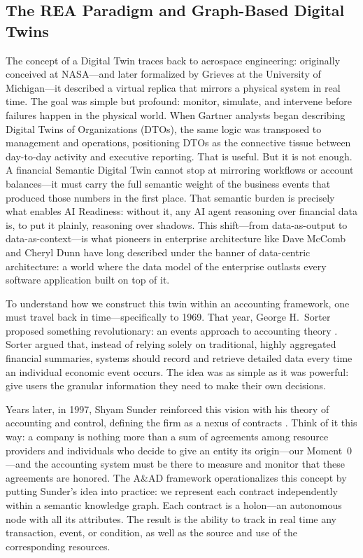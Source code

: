 \documentclass[12pt, a4paper]{article}
\begin{document}
\subsection{The REA Paradigm and Graph-Based Digital Twins}

The concept of a Digital Twin traces back to aerospace engineering: originally conceived at NASA---and later formalized by Grieves \cite{grieves2002} at the University of Michigan---it described a virtual replica that mirrors a physical system in real time. The goal was simple but profound: monitor, simulate, and intervene before failures happen in the physical world. When Gartner analysts began describing Digital Twins of Organizations (DTOs), the same logic was transposed to management and operations, positioning DTOs as the connective tissue between day-to-day activity and executive reporting. That is useful. But it is not enough. A financial Semantic Digital Twin cannot stop at mirroring workflows or account balances---it must carry the full semantic weight of the business events that produced those numbers in the first place. That semantic burden is precisely what enables AI Readiness: without it, any AI agent reasoning over financial data is, to put it plainly, reasoning over shadows. This shift---from data-as-output to data-as-context---is what pioneers in enterprise architecture like Dave McComb \cite{mccomb2019} and Cheryl Dunn \cite{dunn2004} have long described under the banner of data-centric architecture: a world where the data model of the enterprise outlasts every software application built on top of it.

To understand how we construct this twin within an accounting framework, one must travel back in time---specifically to 1969. That year, George H.~Sorter proposed something revolutionary: an events approach to accounting theory \cite{sorter1969}. Sorter argued that, instead of relying solely on traditional, highly aggregated financial summaries, systems should record and retrieve detailed data every time an individual economic event occurs. The idea was as simple as it was powerful: give users the granular information they need to make their own decisions.

Years later, in 1997, Shyam Sunder reinforced this vision with his theory of accounting and control, defining the firm as a nexus of contracts \cite{sunder1997}. Think of it this way: a company is nothing more than a sum of agreements among resource providers and individuals who decide to give an entity its origin---our Moment~0---and the accounting system must be there to measure and monitor that these agreements are honored. The A\&AD framework operationalizes this concept by putting Sunder's idea into practice: we represent each contract independently within a semantic knowledge graph. Each contract is a holon---an autonomous node with all its attributes. The result is the ability to track in real time any transaction, event, or condition, as well as the source and use of the corresponding resources.
\end{document}
